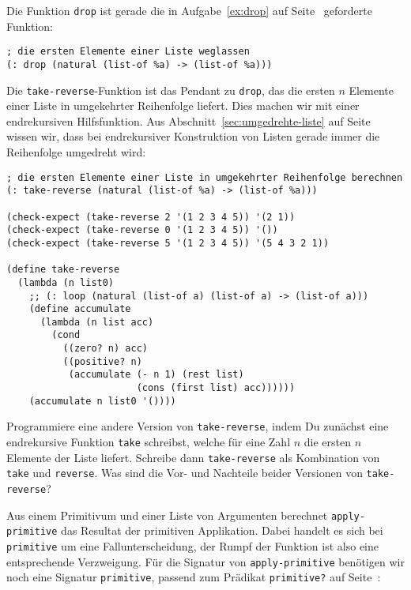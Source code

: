 %
Die Funktion \lstinline{drop} ist gerade die in
Aufgabe~\ref{ex:drop} auf Seite~\pageref{ex:drop} geforderte Funktion:
%
\begin{lstlisting}
; die ersten Elemente einer Liste weglassen
(: drop (natural (list-of %a) -> (list-of %a)))
\end{lstlisting}
%
Die \lstinline{take-reverse}-Funktion ist das Pendant zu
\lstinline{drop}, das die ersten $n$ Elemente einer Liste in
umgekehrter Reihenfolge liefert.  Dies machen wir mit einer
endrekursiven Hilfsfunktion.  Aus Abschnitt~\ref{sec:umgedrehte-liste}
auf Seite~\pageref{sec:umgedrehte-liste} wissen wir, dass bei
endrekursiver Konstruktion von Listen gerade immer die Reihenfolge
umgedreht wird:
%
\begin{lstlisting}
; die ersten Elemente einer Liste in umgekehrter Reihenfolge berechnen
(: take-reverse (natural (list-of %a) -> (list-of %a)))

(check-expect (take-reverse 2 '(1 2 3 4 5)) '(2 1))
(check-expect (take-reverse 0 '(1 2 3 4 5)) '())
(check-expect (take-reverse 5 '(1 2 3 4 5)) '(5 4 3 2 1))

(define take-reverse
  (lambda (n list0)
    ;; (: loop (natural (list-of a) (list-of a) -> (list-of a)))
    (define accumulate
      (lambda (n list acc)
        (cond
          ((zero? n) acc)
          ((positive? n)
           (accumulate (- n 1) (rest list)
                       (cons (first list) acc))))))
    (accumulate n list0 '())))
\end{lstlisting}
%
\begin{aufgabeinline}
  Programmiere eine andere Version von \lstinline{take-reverse}, indem
  Du zunächst eine endrekursive Funktion \lstinline{take} schreibst,
  welche für eine Zahl $n$ die ersten $n$ Elemente der Liste liefert.
  Schreibe dann \lstinline{take-reverse} als Kombination von
  \lstinline{take} und \lstinline{reverse}.  Was sind die Vor- und
  Nachteile beider Versionen von \lstinline{take-reverse}?
\end{aufgabeinline}
%
Aus einem Primitivum und einer Liste von Argumenten berechnet
\lstinline{apply-primitive} das Resultat der primitiven Applikation.
Dabei handelt es sich bei \lstinline{primitive} um eine
Fallunterscheidung, der Rumpf der Funktion ist also eine entsprechende
Verzweigung.  Für die Signatur von \lstinline{apply-primitive}
benötigen wir noch eine Signatur \lstinline{primitive}, passend zum
Prädikat \lstinline{primitive?} auf Seite~\pageref{page:primitivep}:
%
